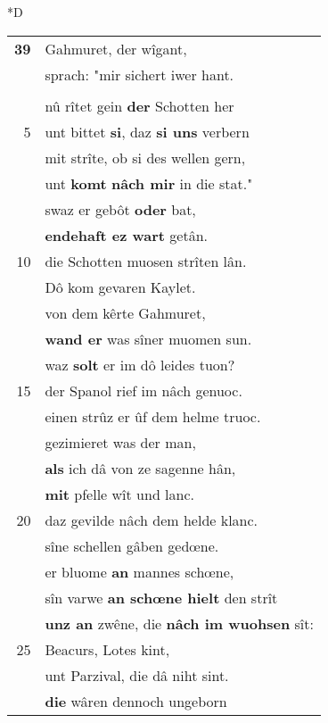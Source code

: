 \documentclass[8pt,a4paper,notitlepage]{article}
\begin{document}
\begin{table}[ht]
\begin{minipage}[t]{0.5\linewidth}
\small
\begin{center}*D
\end{center}
\begin{tabular}{rl}
\textbf{39} & Gahmuret, der wîgant,\\ 
 & sprach: "mir sichert iwer hant.\\ 
 & \textit{\begin{large}D\end{large}}iu was \textbf{bî manlîcher} wer.\\ 
 & nû rîtet gein \textbf{der} Schotten her\\ 
5 & unt bittet \textbf{si}, daz \textbf{si uns} verbern\\ 
 & mit strîte, ob si des wellen gern,\\ 
 & unt \textbf{komt} \textbf{nâch mir} in die stat."\\ 
 & swaz er gebôt \textbf{oder} bat,\\ 
 & \textbf{endehaft ez wart} getân.\\ 
10 & die Schotten muosen strîten lân.\\ 
 & Dô kom gevaren Kaylet.\\ 
 & von dem kêrte Gahmuret,\\ 
 & \textbf{wand er} was sîner muomen sun.\\ 
 & waz \textbf{solt} er im dô leides tuon?\\ 
15 & der Spanol rief im nâch genuoc.\\ 
 & einen strûz er ûf dem helme truoc.\\ 
 & gezimieret was der man,\\ 
 & \textbf{als} ich dâ von ze sagenne hân,\\ 
 & \textbf{mit} pfelle wît und lanc.\\ 
20 & daz gevilde nâch dem helde klanc.\\ 
 & sîne schellen gâben gedœne.\\ 
 & er bluome \textbf{an} mannes schœne,\\ 
 & sîn varwe \textbf{an schœne hielt} den strît\\ 
 & \textbf{unz an} zwêne, die \textbf{nâch im wuohsen} sît:\\ 
25 & Beacurs, Lotes kint,\\ 
 & unt Parzival, die dâ niht sint.\\ 
 & \textbf{die} wâren dennoch ungeborn\\ 

\end{tabular}
\end{minipage}
\end{table}
\end{document}
